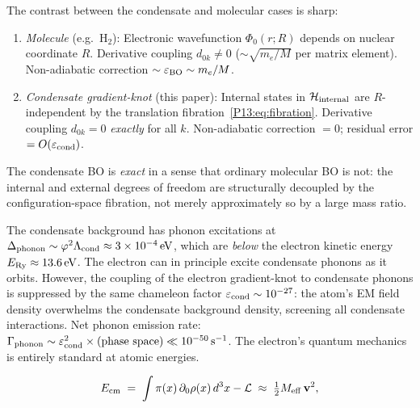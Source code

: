 \begin{remark}
\label{P13:rem:BO_comparison}
The contrast between the condensate and molecular cases is sharp:
\begin{enumerate}[noitemsep]
\item \emph{Molecule} (e.g.\ H$_2$):
  Electronic wavefunction $\Phi_0(r;R)$ depends on nuclear coordinate $R$.
  Derivative coupling $d_{0k}\neq0$ ($\sim\sqrt{m_e/M}$ per matrix element).
  Non-adiabatic correction $\sim\varepsilon_{\rm BO}\sim m_e/M$.
\item \emph{Condensate gradient-knot} (this paper):
  Internal states in $\mathcal{H}_{\rm internal}$ are $R$-independent by the
  translation fibration~\eqref{P13:eq:fibration}.
  Derivative coupling $d_{0k}=0$ \emph{exactly} for all $k$.
  Non-adiabatic correction $=0$; residual error $=O(\varepsilon_{\rm cond})$.
\end{enumerate}
The condensate BO is \emph{exact} in a sense that ordinary molecular BO is not:
the internal and external degrees of freedom are structurally decoupled
by the configuration-space fibration, not merely approximately so by a large mass ratio.
\end{remark}

\begin{remark}
\label{P13:rem:phonons}
The condensate background has phonon excitations at
$\Delta_{\rm phonon}\sim\varphi^2\Lambda_{\mathrm{cond}}\approx3\times10^{-4}\,\mathrm{eV}$,
which are \emph{below} the electron kinetic energy $E_{\mathrm{Ry}}\approx13.6\,\mathrm{eV}$.
The electron can in principle excite condensate phonons as it orbits.
However, the coupling of the electron gradient-knot to condensate
phonons is suppressed by the same chameleon factor
$\varepsilon_{\rm cond}\sim10^{-27}$:
the atom's EM field density overwhelms the condensate background density,
screening all condensate interactions.
Net phonon emission rate: $\Gamma_{\rm phonon}\sim\varepsilon_{\rm cond}^2\times
\text{(phase space)}\ll10^{-50}\,\mathrm{s}^{-1}$.
The electron's quantum mechanics is entirely standard at atomic energies.
\end{remark}

\begin{equation}
  E_{\rm cm}
  \;=\; \int\pi(x)\,\partial_0\rho(x)\,d^3x - \mathcal{L}
  \;\approx\; \tfrac{1}{2}M_{\rm eff}\,\mathbf{v}^2,
  \label{P13:eq:E_cm}
\end{equation}

